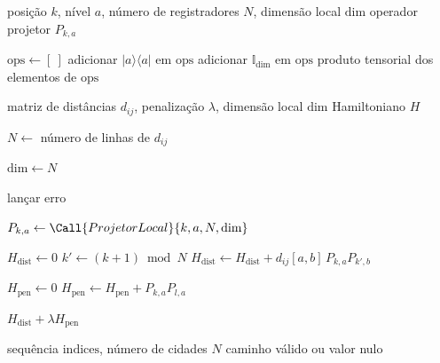 \begin{apendicesenv}
\begin{algorithm}[htbp]
\caption{Construção do projetor local}
\label{alg:projector_k_a}
\begin{algorithmic}[1]
\Require posição $k$, nível $a$, número de registradores $N$, dimensão local $\mathrm{dim}$
\Ensure operador projetor $P_{k,a}$

\State $\mathrm{ops} \gets [\ ]$
        \State adicionar $|a\rangle\langle a|$ em $\mathrm{ops}$
    \Else
        \State adicionar $\mathbb{I}_{\mathrm{dim}}$ em $\mathrm{ops}$
    \EndIf
\EndFor
\State \Return produto tensorial dos elementos de $\mathrm{ops}$
\end{algorithmic}
\end{algorithm}

\begin{algorithm}[htbp]
\caption{Construção do Hamiltoniano do TSP em qumodes}
\label{alg:hamiltoniano_tsp_qudit}
\begin{algorithmic}[1]
\Require matriz de distâncias $d_{ij}$, penalização $\lambda$, dimensão local $\mathrm{dim}$
\Ensure Hamiltoniano $H$

\State $N \gets$ número de linhas de $d_{ij}$

    \State $\mathrm{dim} \gets N$
\EndIf

    \State lançar erro
\EndIf

        \State $P_{k,a} \gets \Call{ProjetorLocal}{k,a,N,\mathrm{dim}}$
    \EndFor
\EndFor

\State $H_{\mathrm{dist}} \gets 0$
    \State $k' \gets (k+1)\bmod N$
            \State $H_{\mathrm{dist}} \gets H_{\mathrm{dist}} + d_{ij}[a,b]\,P_{k,a}P_{k',b}$
        \EndFor
    \EndFor
\EndFor

\State $H_{\mathrm{pen}} \gets 0$
            \State $H_{\mathrm{pen}} \gets H_{\mathrm{pen}} + P_{k,a}P_{l,a}$
        \EndFor
    \EndFor
\EndFor

\State \Return $H_{\mathrm{dist}} + \lambda H_{\mathrm{pen}}$
\end{algorithmic}
\end{algorithm}

\begin{algorithm}[htbp]
\caption{Validação e conversão de índices em caminho}
\label{alg:validacao_caminho}
\begin{algorithmic}[1]
\Require sequência $\mathrm{indices}$, número de cidades $N$
\Ensure caminho válido ou valor nulo


\end{algorithmic}
\end{algorithm}
\end{apendicesenv}
